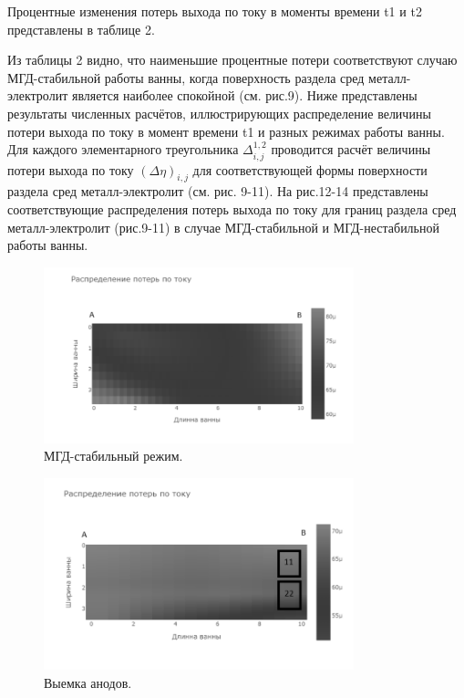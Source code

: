 \documentclass{article}
\begin{document}
Процентные изменения потерь выхода по току в моменты времени t1 и t2 представлены в таблице 2. 


Из таблицы 2 видно, что наименьшие процентные потери соответствуют случаю МГД-стабильной работы ванны, когда поверхность раздела сред металл-электролит является наиболее спокойной (см. рис.9).
Ниже представлены результаты численных расчётов, иллюстрирующих распределение величины потери выхода по току в момент времени t1 и разных режимах работы ванны. Для каждого элементарного треугольника $\Delta^{1,2}_{i,j}$ проводится расчёт величины потери выхода по току $(\Delta\eta)_{i,j}$ для соответствующей формы поверхности раздела сред металл-электролит (см. рис. 9-11). На рис.12-14 представлены соответствующие распределения потерь выхода по току для границ раздела сред металл-электролит (рис.9-11) в случае МГД-стабильной и МГД-нестабильной работы ванны. 

\begin{figure}[h!]
    \centering
    \includegraphics[width=90mm]{h.png}
    \caption{МГД-стабильный режим.}
    \label{fig:} 
\end{figure}

\begin{figure}[h!]
    \centering
    \includegraphics[width=90mm]{выемка анодов.png}
    \caption{Выемка анодов.}
    \label{fig:} 
\end{figure}
\end{document}
